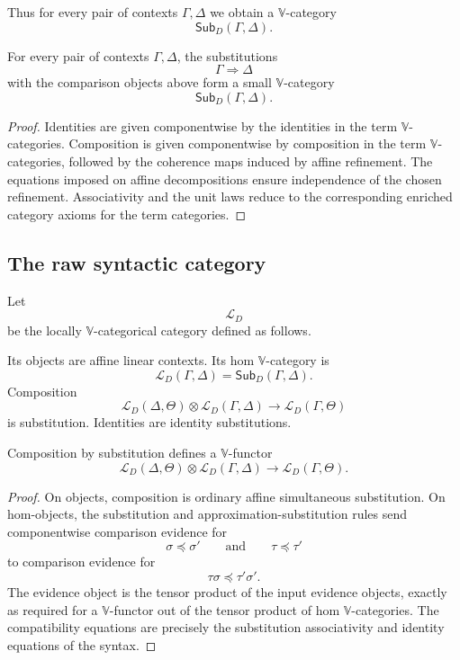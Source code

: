 Thus for every pair of contexts \(\Gamma,\Delta\) we obtain a
\(\mathbb V\)-category
\[
    \mathsf{Sub}_D(\Gamma,\Delta).
\]

\begin{lemma}
\label{lem:substitution-homs-V-categories}
For every pair of contexts \(\Gamma,\Delta\), the substitutions
\[
    \Gamma\Rightarrow\Delta
\]
with the comparison objects above form a small \(\mathbb V\)-category
\[
    \mathsf{Sub}_D(\Gamma,\Delta).
\]
\end{lemma}

\begin{proof}
Identities are given componentwise by the identities in the term
\(\mathbb V\)-categories.  Composition is given componentwise by composition
in the term \(\mathbb V\)-categories, followed by the coherence maps induced
by affine refinement.  The equations imposed on affine decompositions ensure
independence of the chosen refinement.  Associativity and the unit laws reduce
to the corresponding enriched category axioms for the term categories.
\end{proof}

\subsection{The raw syntactic category}
\label{subsec:raw-syntactic-category}

\begin{definition}
\label{def:raw-syntactic-category}
Let
\[
    \mathcal L_D
\]
be the locally \(\mathbb V\)-categorical category defined as follows.

Its objects are affine linear contexts.  Its hom \(\mathbb V\)-category is
\[
    \mathcal L_D(\Gamma,\Delta)
    =
    \mathsf{Sub}_D(\Gamma,\Delta).
\]
Composition
\[
    \mathcal L_D(\Delta,\Theta)
    \otimes
    \mathcal L_D(\Gamma,\Delta)
    \longrightarrow
    \mathcal L_D(\Gamma,\Theta)
\]
is substitution.  Identities are identity substitutions.
\end{definition}

\begin{lemma}
\label{lem:substitution-enriched-functorial}
Composition by substitution defines a \(\mathbb V\)-functor
\[
    \mathcal L_D(\Delta,\Theta)
    \otimes
    \mathcal L_D(\Gamma,\Delta)
    \longrightarrow
    \mathcal L_D(\Gamma,\Theta).
\]
\end{lemma}

\begin{proof}
On objects, composition is ordinary affine simultaneous substitution.
On hom-objects, the substitution and approximation-substitution rules send
componentwise comparison evidence for
\[
    \sigma\preceq\sigma'
    \qquad\text{and}\qquad
    \tau\preceq\tau'
\]
to comparison evidence for
\[
    \tau\sigma\preceq\tau'\sigma'.
\]
The evidence object is the tensor product of the input evidence objects,
exactly as required for a \(\mathbb V\)-functor out of the tensor product of
hom \(\mathbb V\)-categories.  The compatibility equations are precisely the
substitution associativity and identity equations of the syntax.
\end{proof}

